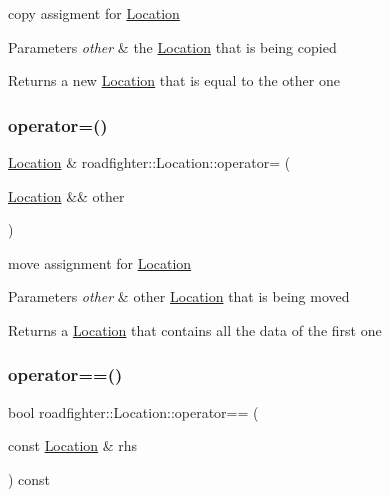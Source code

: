 copy assigment for \hyperlink{classroadfighter_1_1Location}{Location} 
\begin{DoxyParams}{Parameters}
{\em other} & the \hyperlink{classroadfighter_1_1Location}{Location} that is being copied \\
\hline
\end{DoxyParams}
\begin{DoxyReturn}{Returns}
a new \hyperlink{classroadfighter_1_1Location}{Location} that is equal to the other one 
\end{DoxyReturn}
\mbox{\label{classroadfighter_1_1Location_a638a7648859525b0f56cc2fcc49de6f2}} 
\subsubsection{\texorpdfstring{operator=()}{operator=()}\hspace{0.1cm}{\footnotesize\ttfamily [2/2]}}
{\footnotesize\ttfamily \hyperlink{classroadfighter_1_1Location}{Location} \& roadfighter\+::\+Location\+::operator= (\begin{DoxyParamCaption}\item[{\hyperlink{classroadfighter_1_1Location}{Location} \&\&}]{other }\end{DoxyParamCaption})\hspace{0.3cm}{\ttfamily [noexcept]}}

move assignment for \hyperlink{classroadfighter_1_1Location}{Location} 
\begin{DoxyParams}{Parameters}
{\em other} & other \hyperlink{classroadfighter_1_1Location}{Location} that is being moved \\
\hline
\end{DoxyParams}
\begin{DoxyReturn}{Returns}
a \hyperlink{classroadfighter_1_1Location}{Location} that contains all the data of the first one 
\end{DoxyReturn}
\mbox{\label{classroadfighter_1_1Location_a41950b871d6b83269c063e9d34bbc24c}} 
\subsubsection{\texorpdfstring{operator==()}{operator==()}}
{\footnotesize\ttfamily bool roadfighter\+::\+Location\+::operator== (\begin{DoxyParamCaption}\item[{const \hyperlink{classroadfighter_1_1Location}{Location} \&}]{rhs }\end{DoxyParamCaption}) const}

